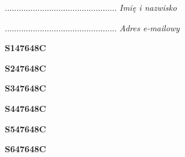 \begin{turn}{90}\begin{minipage}{\linewidth} \vspace{20mm} ................................................  \textit{Imię i nazwisko}\end{minipage}\end{turn}

\begin{turn}{90}\begin{minipage}{\linewidth} \vspace{20mm} ................................................  \textit{Adres e-mailowy}\end{minipage}\end{turn}

\begin{turn}{90}\huge \begin{minipage}{\linewidth} \vspace{10mm}\textbf{S147648C}\end{minipage}\end{turn}

\begin{turn}{90}\huge \begin{minipage}{\linewidth} \vspace{10mm}\textbf{S247648C}\end{minipage}\end{turn}

\begin{turn}{90}\huge \begin{minipage}{\linewidth} \vspace{10mm}\textbf{S347648C}\end{minipage}\end{turn}

\begin{turn}{90}\huge \begin{minipage}{\linewidth} \vspace{10mm}\textbf{S447648C}\end{minipage}\end{turn}

\begin{turn}{90}\huge \begin{minipage}{\linewidth} \vspace{10mm}\textbf{S547648C}\end{minipage}\end{turn}

\begin{turn}{90}\huge \begin{minipage}{\linewidth} \vspace{10mm}\textbf{S647648C}\end{minipage}\end{turn}

